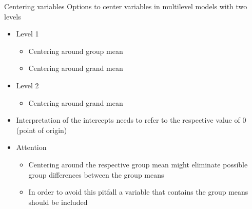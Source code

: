 \documentclass{beamer}
\begin{document}
\begin{frame}{Centering variables}
  Options to center variables in multilevel models with two levels
  \begin{itemize}
    \item Level 1
      \begin{itemize}
        \item Centering around group mean
        \item Centering around grand mean
      \end{itemize}
    \item Level 2
      \begin{itemize}
        \item Centering around grand mean
      \end{itemize}
    \item Interpretation of the intercepts needs to refer to the respective
      value of 0 (point of origin)
    \item Attention
      \begin{itemize}
        \item Centering around the respective group mean might eliminate
          possible group differences between the group means
        \item In order to avoid this pitfall a variable that contains the
          group means should be included
      \end{itemize}
  \end{itemize}
\end{frame}
\end{document}
